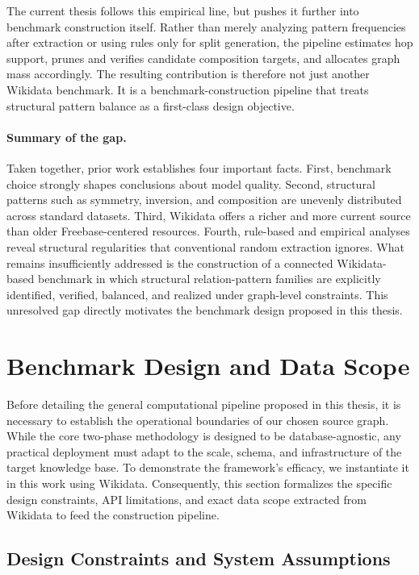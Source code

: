 \documentclass[12pt,a4paper]{article}
\begin{document}
The current thesis follows this empirical line, but pushes it further into benchmark construction itself. Rather than merely analyzing pattern frequencies after extraction or using rules only for split generation, the pipeline estimates hop support, prunes and verifies candidate composition targets, and allocates graph mass accordingly. The resulting contribution is therefore not just another Wikidata benchmark. It is a benchmark-construction pipeline that treats structural pattern balance as a first-class design objective.

\paragraph{Summary of the gap.}
Taken together, prior work establishes four important facts. First, benchmark choice strongly shapes conclusions about model quality. Second, structural patterns such as symmetry, inversion, and composition are unevenly distributed across standard datasets. Third, Wikidata offers a richer and more current source than older Freebase-centered resources. Fourth, rule-based and empirical analyses reveal structural regularities that conventional random extraction ignores. What remains insufficiently addressed is the construction of a connected Wikidata-based benchmark in which structural relation-pattern families are explicitly identified, verified, balanced, and realized under graph-level constraints. This unresolved gap directly motivates the benchmark design proposed in this thesis.

\section{Benchmark Design and Data Scope}
\label{sec:design_and_data}

Before detailing the general computational pipeline proposed in this thesis, it is necessary to establish the operational boundaries of our chosen source graph. While the core two-phase methodology is designed to be database-agnostic, any practical deployment must adapt to the scale, schema, and infrastructure of the target knowledge base. To demonstrate the framework's efficacy, we instantiate it in this work using Wikidata. Consequently, this section formalizes the specific design constraints, API limitations, and exact data scope extracted from Wikidata to feed the construction pipeline.

\subsection{Design Constraints and System Assumptions}
\end{document}
